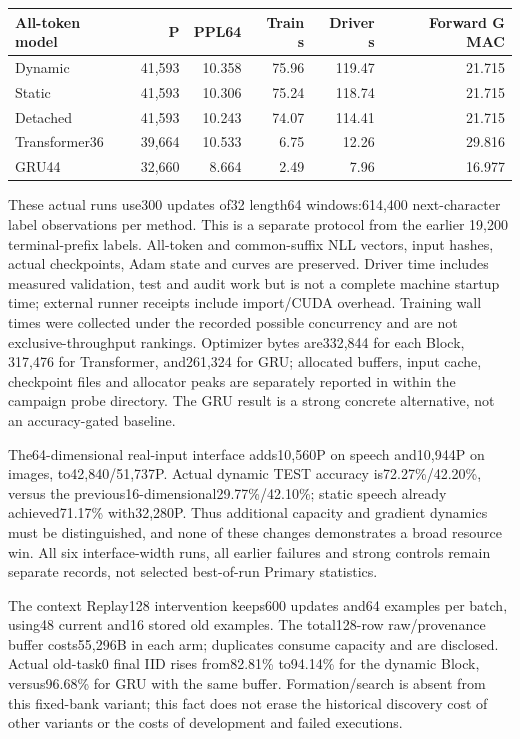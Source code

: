\begin{longtable}{lrrrrr}
\toprule
All-token model & P & PPL64 & Train s & Driver s & Forward G MAC\\
\midrule
Dynamic &41,593&10.358&75.96&119.47&21.715\\
Static &41,593&10.306&75.24&118.74&21.715\\
Detached &41,593&10.243&74.07&114.41&21.715\\
Transformer36 &39,664&10.533&6.75&12.26&29.816\\
GRU44 &32,660&8.664&2.49&7.96&16.977\\
\bottomrule
\end{longtable}
These actual runs use300 updates of32 length64 windows:614,400 next-character
label observations per method. This is a separate protocol from the earlier
19,200 terminal-prefix labels. All-token and common-suffix NLL vectors, input
hashes, actual checkpoints, Adam state and curves are preserved. Driver time
includes measured validation, test and audit work but is not a complete machine
startup time; external runner receipts include import/CUDA overhead. Training
wall times were collected under the recorded possible concurrency and are not
exclusive-throughput rankings. Optimizer bytes are332,844 for each Block,
317,476 for Transformer, and261,324 for GRU; allocated buffers, input cache,
checkpoint files and allocator peaks are separately reported in
 within the campaign
probe directory. The GRU result is a strong concrete alternative, not an
accuracy-gated baseline.

The64-dimensional real-input interface adds10,560P on speech and10,944P on
images, to42,840/51,737P. Actual dynamic TEST accuracy is72.27\%/42.20\%,
versus the previous16-dimensional29.77\%/42.10\%; static speech already
achieved71.17\% with32,280P. Thus additional capacity and gradient dynamics
must be distinguished, and none of these changes demonstrates a broad resource
win. All six interface-width runs, all earlier failures and strong controls
remain separate records, not selected best-of-run Primary statistics.

The context Replay128 intervention keeps600 updates and64 examples per batch,
using48 current and16 stored old examples. The total128-row raw/provenance
buffer costs55,296B in each arm; duplicates consume capacity and are disclosed.
Actual old-task0 final IID rises from82.81\% to94.14\% for the dynamic Block,
versus96.68\% for GRU with the same buffer. Formation/search is absent from this
fixed-bank variant; this fact does not erase the historical discovery cost of
other variants or the costs of development and failed executions.

